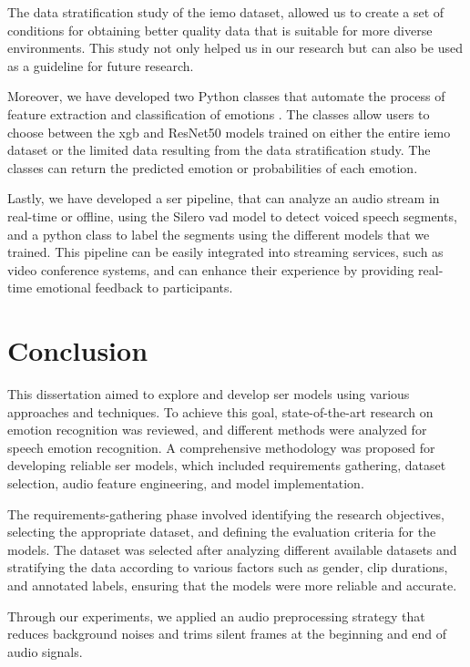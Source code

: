 The data stratification study of the \ac{iemo} dataset, allowed us to create a set of conditions for obtaining better quality data that is suitable for more diverse environments. This study not only helped us in our research but can also be used as a guideline for future research.

Moreover, we have developed two Python classes that automate the process of feature extraction and classification of emotions \cite{Mario_Silva_Speech_Emotion_Recognition_2023}. The classes allow users to choose between the \ac{xgb} and ResNet50 models trained on either the entire \ac{iemo} dataset or the limited data resulting from the data stratification study. The classes can return the predicted emotion or probabilities of each emotion.

Lastly, we have developed a \ac{ser} pipeline, that can analyze an audio stream in real-time or offline, using the Silero \ac{vad} model to detect voiced speech segments, and a python class to label the segments using the different models that we trained. This pipeline can be easily integrated into streaming services, such as video conference systems, and can enhance their experience by providing real-time emotional feedback to participants.

\section{Conclusion}

This dissertation aimed to explore and develop \ac{ser} models using various approaches and techniques. To achieve this goal, state-of-the-art research on emotion recognition was reviewed, and different methods were analyzed for speech emotion recognition. A comprehensive methodology was proposed for developing reliable \ac{ser} models, which included requirements gathering, dataset selection, audio feature engineering, and model implementation.

The requirements-gathering phase involved identifying the research objectives, selecting the appropriate dataset, and defining the evaluation criteria for the models. The dataset was selected after analyzing different available datasets and stratifying the data according to various factors such as gender, clip durations, and annotated labels, ensuring that the models were more reliable and accurate.

Through our experiments, we applied an audio preprocessing strategy that reduces background noises and trims silent frames at the beginning and end of audio signals.

